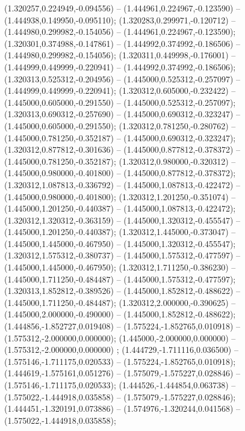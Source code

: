  (1.320257,0.224949,-0.094556) -- (1.444961,0.224967,-0.123590) -- (1.444938,0.149950,-0.095110);
 (1.320283,0.299971,-0.120712) -- (1.444980,0.299982,-0.154056) -- (1.444961,0.224967,-0.123590);
 (1.320301,0.374988,-0.147861) -- (1.444992,0.374992,-0.186506) -- (1.444980,0.299982,-0.154056);
 (1.320311,0.449998,-0.176001) -- (1.444999,0.449999,-0.220941) -- (1.444992,0.374992,-0.186506);
 (1.320313,0.525312,-0.204956) -- (1.445000,0.525312,-0.257097) -- (1.444999,0.449999,-0.220941);
 (1.320312,0.605000,-0.232422) -- (1.445000,0.605000,-0.291550) -- (1.445000,0.525312,-0.257097);
 (1.320313,0.690312,-0.257690) -- (1.445000,0.690312,-0.323247) -- (1.445000,0.605000,-0.291550);
 (1.320312,0.781250,-0.280762) -- (1.445000,0.781250,-0.352187) -- (1.445000,0.690312,-0.323247);
 (1.320312,0.877812,-0.301636) -- (1.445000,0.877812,-0.378372) -- (1.445000,0.781250,-0.352187);
 (1.320312,0.980000,-0.320312) -- (1.445000,0.980000,-0.401800) -- (1.445000,0.877812,-0.378372);
 (1.320312,1.087813,-0.336792) -- (1.445000,1.087813,-0.422472) -- (1.445000,0.980000,-0.401800);
 (1.320312,1.201250,-0.351074) -- (1.445000,1.201250,-0.440387) -- (1.445000,1.087813,-0.422472);
 (1.320312,1.320312,-0.363159) -- (1.445000,1.320312,-0.455547) -- (1.445000,1.201250,-0.440387);
 (1.320312,1.445000,-0.373047) -- (1.445000,1.445000,-0.467950) -- (1.445000,1.320312,-0.455547);
 (1.320312,1.575312,-0.380737) -- (1.445000,1.575312,-0.477597) -- (1.445000,1.445000,-0.467950);
 (1.320312,1.711250,-0.386230) -- (1.445000,1.711250,-0.484487) -- (1.445000,1.575312,-0.477597);
 (1.320313,1.852812,-0.389526) -- (1.445000,1.852812,-0.488622) -- (1.445000,1.711250,-0.484487);
 (1.320312,2.000000,-0.390625) -- (1.445000,2.000000,-0.490000) -- (1.445000,1.852812,-0.488622);
 (1.444856,-1.852727,0.019408) -- (1.575224,-1.852765,0.010918) -- (1.575312,-2.000000,0.000000);
 (1.445000,-2.000000,0.000000) -- (1.575312,-2.000000,0.000000) ;
 (1.444729,-1.711116,0.036500) -- (1.575146,-1.711175,0.020533) -- (1.575224,-1.852765,0.010918);
 (1.444619,-1.575161,0.051276) -- (1.575079,-1.575227,0.028846) -- (1.575146,-1.711175,0.020533);
 (1.444526,-1.444854,0.063738) -- (1.575022,-1.444918,0.035858) -- (1.575079,-1.575227,0.028846);
 (1.444451,-1.320191,0.073886) -- (1.574976,-1.320244,0.041568) -- (1.575022,-1.444918,0.035858);
